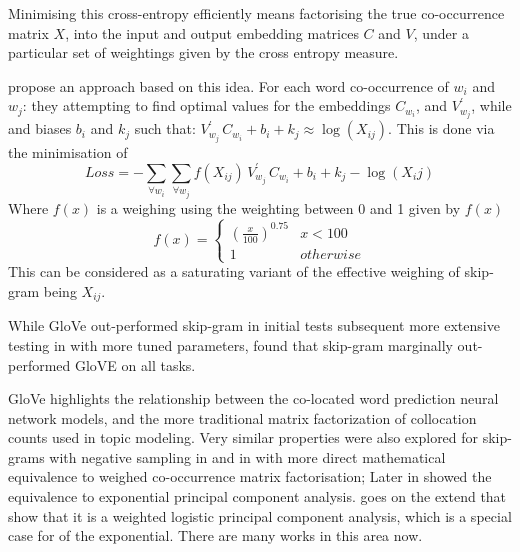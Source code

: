 \documentclass[parskip]{komatufte}
\begin{document}
Minimising this cross-entropy efficiently means  factorising the true co-occurrence matrix $X$,
into the input and output embedding matrices $C$ and $V$, under a particular set of weightings given by the cross entropy measure.



\textcite{pennington2014glove} propose an approach based on this idea.
For each word co-occurrence of $w_i$ and $w_j$: they attempting to find optimal values for 
the embeddings $C_{w_{i}}$, and $V_{w_j}^\prime$, while and biases $b_i$ and $k_j$
such that:
$V_{w_j}^\prime\,C_{w_{i}} + b_i + k_j \approx \log(X_{ij})$.
This is done via the minimisation of 
\begin{equation}
Loss = - \sum_{\forall w_i}  \sum_{\forall w_j} f(X_{ij})\,V_{w_j}^\prime\,C_{w_{i}}+b_i+k_j-\log (X_ij)
\end{equation}
Where $f(x)$ is a weighing using the weighting between 0 and 1 given by $f(x)$
\begin{equation}
f(x)=\begin{cases}
\left(\frac{x}{100}\right)^{0.75} & x<100\\
1 & otherwise
\end{cases}
\end{equation}
This can be considered as a saturating variant of the effective weighing of skip-gram being $X_{ij}$.


While GloVe out-performed  skip-gram in initial tests subsequent more extensive testing in  with more tuned parameters,
found that skip-gram marginally out-performed GloVE on all tasks.





GloVe highlights the relationship between the co-located word prediction neural network models,
and the more traditional matrix factorization of collocation counts used in topic modeling.
Very similar properties were also explored for skip-grams with negative sampling in  and in  with more direct mathematical equivalence to weighed co-occurrence matrix factorisation;
Later in  showed the equivalence to exponential principal component analysis.
 goes on the extend that show that it is a weighted logistic principal component analysis, which is a special case for of the exponential.
There are many works in this area now.
\end{document}
